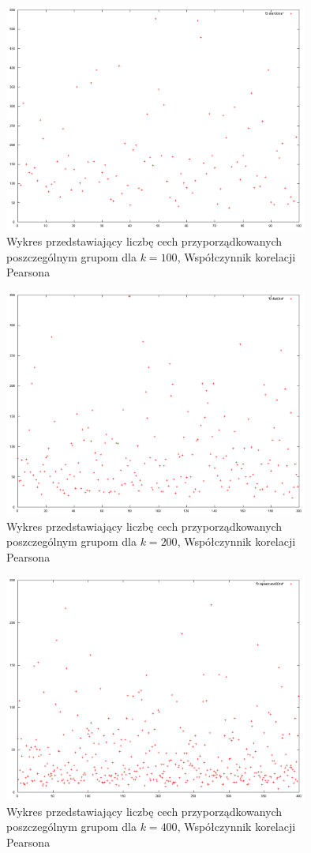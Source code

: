 \documentclass{classrep}
\begin{document}
\begin{figure}
  \centering
  \includegraphics[width=10cm]{img/pearson100.png}
  \caption{Wykres przedstawiający liczbę cech przyporządkowanych poszczególnym
grupom dla $k=100$, Współczynnik korelacji Pearsona}
  \label{pearson.100}
\end{figure}

\begin{figure}
  \centering
  \includegraphics[width=10cm]{img/pearson200.png}
  \caption{Wykres przedstawiający liczbę cech przyporządkowanych poszczególnym
grupom dla $k=200$, Współczynnik korelacji Pearsona}
  \label{pearson.200}
\end{figure}

\begin{figure}
  \centering
  \includegraphics[width=10cm]{img/spearman400.png}
  \caption{Wykres przedstawiający liczbę cech przyporządkowanych poszczególnym
grupom dla $k=400$, Współczynnik korelacji Pearsona}
  \label{spearman.400}
\end{figure}
\end{document}
